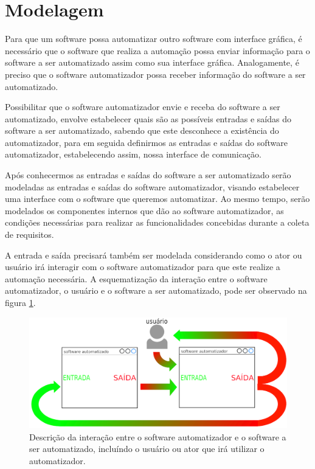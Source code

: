 \documentclass[tg]{mdtufsm}
\begin{document}
        \section{Modelagem}

            Para que um software possa automatizar outro software com interface gráfica, é necessário que o software que realiza a automação possa enviar informação para o software a ser automatizado assim como sua interface gráfica. Analogamente, é preciso que o software automatizador possa receber informação do software a ser automatizado.

            Possibilitar que o software automatizador envie e receba do software a ser automatizado,  envolve estabelecer quais são as possíveis entradas e saídas do software a ser automatizado, sabendo que este desconhece a existência do automatizador, para em seguida definirmos as entradas e saídas do software automatizador, estabelecendo assim, nossa interface de comunicação.

            Após conhecermos as entradas e saídas do software a ser automatizado serão modeladas as entradas e saídas do software automatizador, visando estabelecer uma interface com o software que queremos automatizar. Ao mesmo tempo, serão modelados os componentes internos que dão ao software automatizador, as condições necessárias para realizar as funcionalidades concebidas durante a coleta de requisitos.

            A entrada e saída precisará também ser modelada considerando como o ator ou usuário irá interagir com o software automatizador para que este realize a automação necessária. A esquematização da interação entre o software automatizador, o usuário e o software a ser automatizado, pode ser observado na figura \ref{fig:generalIO}.

            \begin{figure}[!htb]
                {\centering
                \includegraphics[width=1.0\textwidth]{imagens/generalIO}
                \caption{Descrição da interação entre o software automatizador e o software a ser automatizado, incluíndo o usuário ou ator que irá utilizar o automatizador.}
                \label{fig:generalIO}}
            \end{figure}
\end{document}
